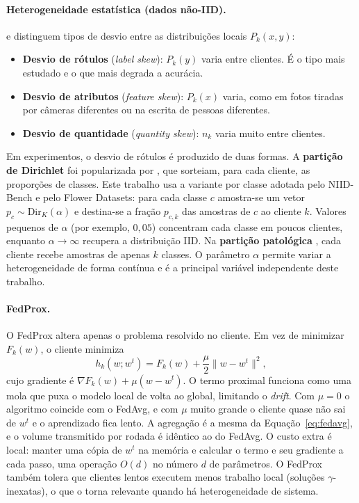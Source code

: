 \paragraph{Heterogeneidade estatística (dados não-IID).}
\citet{kairouz2021advances} e \citet{li2022niidbench} distinguem tipos de desvio entre as distribuições locais $P_k(x,y)$:
\begin{itemize}[leftmargin=*, itemsep=1pt]
    \item \textbf{Desvio de rótulos} (\textit{label skew}): $P_k(y)$ varia entre clientes. É o tipo mais estudado e o que mais degrada a acurácia.
    \item \textbf{Desvio de atributos} (\textit{feature skew}): $P_k(x)$ varia, como em fotos tiradas por câmeras diferentes ou na escrita de pessoas diferentes.
    \item \textbf{Desvio de quantidade} (\textit{quantity skew}): $n_k$ varia muito entre clientes.
\end{itemize}
Em experimentos, o desvio de rótulos é produzido de duas formas. A \textbf{partição de Dirichlet} foi popularizada por \citet{hsu2019fedavgm}, que sorteiam, para cada cliente, as proporções de classes. Este trabalho usa a variante por classe adotada pelo NIID-Bench \citep{li2022niidbench} e pelo Flower Datasets: para cada classe $c$ amostra-se um vetor $p_c \sim \mathrm{Dir}_K(\alpha)$ e destina-se a fração $p_{c,k}$ das amostras de $c$ ao cliente $k$. Valores pequenos de $\alpha$ (por exemplo, $0{,}05$) concentram cada classe em poucos clientes, enquanto $\alpha \to \infty$ recupera a distribuição IID. Na \textbf{partição patológica} \citep{mcmahan2017fedavg}, cada cliente recebe amostras de apenas $k$ classes. O parâmetro $\alpha$ permite variar a heterogeneidade de forma contínua e é a principal variável independente deste trabalho.

\paragraph{FedProx.}
O FedProx \citep{li2020fedprox} altera apenas o problema resolvido no cliente. Em vez de minimizar $F_k(w)$, o cliente minimiza
\begin{equation}
    h_k(w; w^t) = F_k(w) + \frac{\mu}{2}\lVert w - w^t \rVert^2 ,
    \label{eq:fedprox}
\end{equation}
cujo gradiente é $\nabla F_k(w) + \mu (w - w^t)$. O termo proximal funciona como uma mola que puxa o modelo local de volta ao global, limitando o \textit{drift}. Com $\mu = 0$ o algoritmo coincide com o FedAvg, e com $\mu$ muito grande o cliente quase não sai de $w^t$ e o aprendizado fica lento. A agregação é a mesma da Equação~\eqref{eq:fedavg}, e o volume transmitido por rodada é idêntico ao do FedAvg. O custo extra é local: manter uma cópia de $w^t$ na memória e calcular o termo e seu gradiente a cada passo, uma operação $O(d)$ no número $d$ de parâmetros. O FedProx também tolera que clientes lentos executem menos trabalho local (soluções $\gamma$-inexatas), o que o torna relevante quando há heterogeneidade de sistema.

